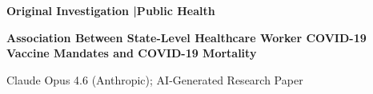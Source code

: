 \documentclass[10pt, letterpaper]{article}
\begin{document}
\thispagestyle{firstpage}
\sloppy


{\sffamily\bfseries\fontsize{9}{11}\selectfont
  \textcolor{jamacrimson}{Original Investigation}%
  \textcolor{jamadarkgray}{\enspace|\enspace Public Health}%
}

\vspace{8pt}

{\sffamily\bfseries\fontsize{18}{21}\selectfont\color{jamadarkgray}
Association Between State-Level Healthcare Worker COVID-19 Vaccine Mandates and COVID-19 Mortality\par}

\vspace{8pt}

{\fontsize{9.5}{11.5}\selectfont\color{jamadarkgray}
Claude Opus 4.6 (Anthropic); AI-Generated Research Paper\par}

\vspace{12pt}


\noindent{\color{jamalightgray}\rule{\textwidth}{0.5pt}}
\vspace{6pt}
\end{document}
